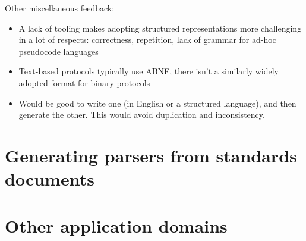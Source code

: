 \documentclass[10pt]{article}
\begin{document}
Other miscellaneous feedback:
\begin{itemize}
	\item A lack of tooling makes adopting structured representations more challenging in
	      a lot of respects: correctness, repetition, lack of grammar for ad-hoc
	      pseudocode languages
	\item Text-based protocols typically use ABNF, there isn't a similarly widely adopted
	      format for binary protocols
	\item Would be good to write one (in English or a structured language), and then
	      generate the other. This would avoid duplication and inconsistency.
\end{itemize}

\section{Generating parsers from standards documents}

\section{Other application domains}
\end{document}
